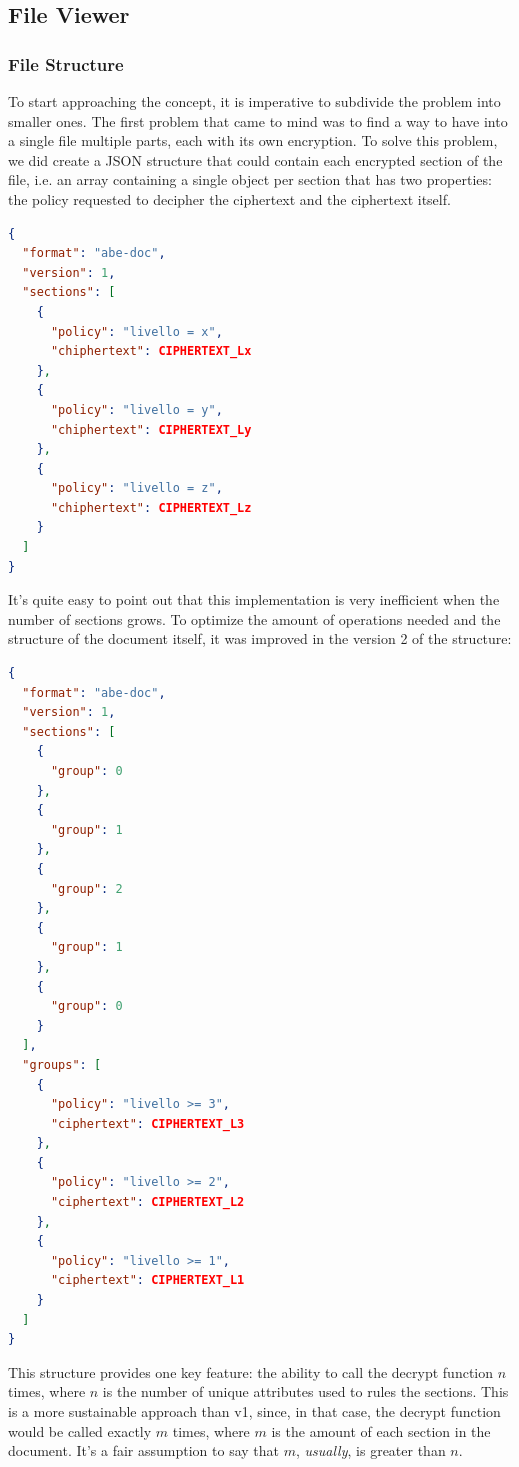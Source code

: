 
\subsection{File Viewer}
\subsubsection{File Structure} \label{File Structure}
To start approaching the concept, it is imperative to subdivide the problem into smaller ones. The first problem that came to mind was to find a way to have into a single file multiple parts, each with its own encryption.
To solve this problem, we did create a JSON structure that could contain each encrypted section of the file, i.e. an array containing a single object per section that has two properties: the policy requested to decipher the ciphertext and the ciphertext itself.
\begin{lstlisting}[language=JSON, caption={.abe format v1}]
{
  "format": "abe-doc",
  "version": 1,
  "sections": [
    {
      "policy": "livello = x",
      "chiphertext": CIPHERTEXT_Lx
    },
    {
      "policy": "livello = y",
      "chiphertext": CIPHERTEXT_Ly
    },
    {
      "policy": "livello = z",
      "chiphertext": CIPHERTEXT_Lz
    }
  ]
}
\end{lstlisting}
It's quite easy to point out that this implementation is very inefficient when the number of sections grows. To optimize the amount of operations needed and the structure of the document itself, it was improved in the version 2 of the structure:
\begin{lstlisting}[language=JSON, caption={.abe v2}]
{
  "format": "abe-doc",
  "version": 1,
  "sections": [
    {
      "group": 0
    },
    {
      "group": 1
    },
    {
      "group": 2
    },
    {
      "group": 1
    },
    {
      "group": 0
    }
  ],
  "groups": [
    {
      "policy": "livello >= 3",
      "ciphertext": CIPHERTEXT_L3
    },
    {
      "policy": "livello >= 2",
      "ciphertext": CIPHERTEXT_L2
    },
    {
      "policy": "livello >= 1",
      "ciphertext": CIPHERTEXT_L1
    }
  ]
}
\end{lstlisting}
This structure provides one key feature: the ability to call the decrypt function $n$ times, where $n$ is the number of unique attributes used to rules the sections. This is a more sustainable approach than v1, since, in that case, the decrypt function would be called exactly $m$ times, where $m$ is the amount of each section in the document. It's a fair assumption to say that $m$, \textit{usually}, is greater than $n$.
